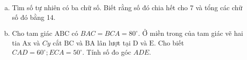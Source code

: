 \begin{bt}
   \hfill
   \begin{enumerate}[a.]
    \item Tìm số tự nhiên có ba chữ số. Biết rằng số đó chia hết cho 7 và tổng các chữ số đó bằng 14.
    \item Cho tam giác $\mathrm{ABC}$ có $B A C=B C A=80^{\circ}$. Ở miền trong của tam giác vẽ hai tia $\mathrm{Ax}$ và $C y$ cắt $\mathrm{BC}$ và $\mathrm{BA}$ lân lượt tại $\mathrm{D}$ và $\mathrm{E}$. Cho biết $C A D=60^{\circ} ; E C A=50^{\circ}$.
    Tính số đo góc $A D E$.
   \end{enumerate}
\loigiai{}
\end{bt}


